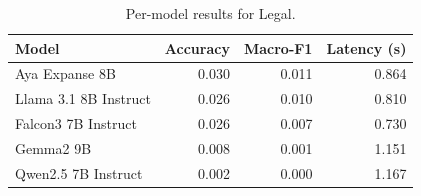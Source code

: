 \begin{table}[t]
\centering
\caption{Per-model results for Legal.}
\label{tab:appendix-legal-classification-analysis}
\begin{tabular}{lrrr}
\toprule
Model & Accuracy & Macro-F1 & Latency (s) \\
\midrule
Aya Expanse 8B & 0.030 & 0.011 & 0.864 \\
Llama 3.1 8B Instruct & 0.026 & 0.010 & 0.810 \\
Falcon3 7B Instruct & 0.026 & 0.007 & 0.730 \\
Gemma2 9B & 0.008 & 0.001 & 1.151 \\
Qwen2.5 7B Instruct & 0.002 & 0.000 & 1.167 \\
\bottomrule
\end{tabular}
\end{table}
